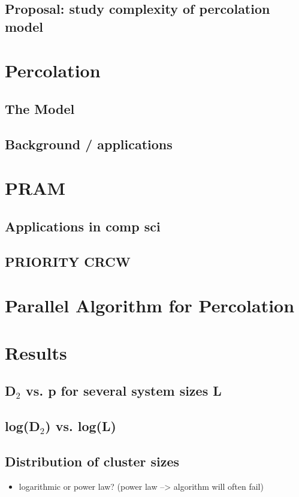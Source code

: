 \documentclass{umthesis}
\begin{document}
\subsection{Proposal: study complexity of percolation model}
\label{sec-4.1.2}
\section{Percolation}
\label{sec-4.2}
\subsection{The Model}
\label{sec-4.2.1}
\subsection{Background / applications}
\label{sec-4.2.2}
\section{PRAM}
\label{sec-4.3}
\subsection{Applications in comp sci}
\label{sec-4.3.1}
\subsection{PRIORITY CRCW}
\label{sec-4.3.2}
\section{Parallel Algorithm for Percolation}
\label{sec-4.4}
\section{Results}
\label{sec-4.5}
\subsection{D$_2$ vs. p for several system sizes L}
\label{sec-4.5.1}
\subsection{log(D$_2$) vs. log(L)}
\label{sec-4.5.2}
\subsection{Distribution of cluster sizes}
\label{sec-4.5.3}
\begin{itemize}

\item logarithmic or power law? (power law --> algorithm will often fail)\\
\label{sec-4.5.3.1}%
\end{itemize} %
\end{document}
